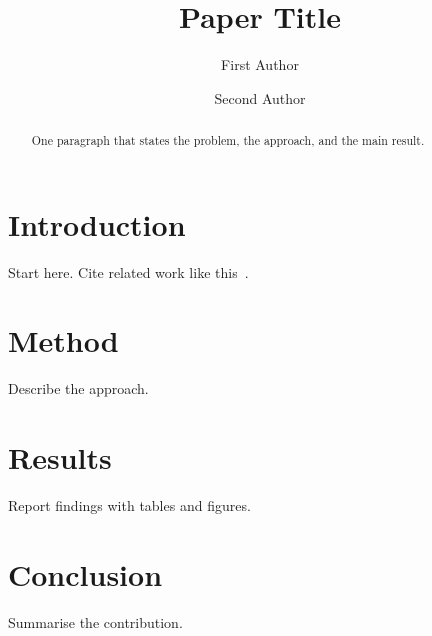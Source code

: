 \documentclass[runningheads]{llncs}
\begin{document}
\title{Paper Title}
\author{First Author \and
Second Author}

\maketitle

\begin{abstract}
One paragraph that states the problem, the approach, and the main result.
\end{abstract}

\section{Introduction}
Start here. Cite related work like this~\cite{knuth1984,lamport1986}.

\section{Method}
Describe the approach.

\section{Results}
Report findings with tables and figures.

\section{Conclusion}
Summarise the contribution.



\end{document}
